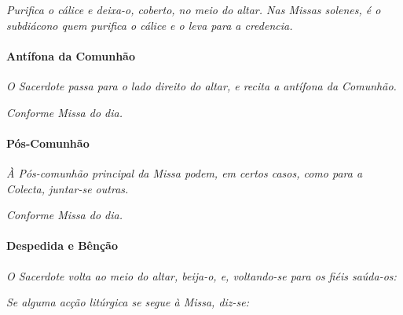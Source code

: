 \textit{Purifica o cálice e deixa-o, coberto, no meio do altar. Nas Missas solenes, é o subdiácono quem purifica o cálice e o leva para a credencia.}

\paragraph{Antífona da Comunhão}

\textit{O Sacerdote passa para o lado direito do altar, e recita a antífona da Comunhão.}

\emph{Conforme Missa do dia.}

\begin{paracol}{2}\switchcolumn{}\switchcolumn*{}\switchcolumn{}\end{paracol}

\paragraph{Pós-Comunhão}

\textit{À Pós-comunhão principal da Missa podem, em certos casos, como para a Colecta, juntar-se outras.}

\emph{Conforme Missa do dia.}

\paragraph{Despedida e Bênção}

\textit{O Sacerdote volta ao meio do altar, beija-o, e, voltando-se para os fiéis saúda-os:}

\begin{paracol}{2}\switchcolumn{}\switchcolumn*{}\switchcolumn{}\switchcolumn*{}\switchcolumn{}\switchcolumn*{}\switchcolumn{}\end{paracol}

\textit{Se alguma acção litúrgica se segue à Missa, diz-se:}

\begin{paracol}{2}\switchcolumn{}\switchcolumn*{}\switchcolumn{}\end{paracol}

